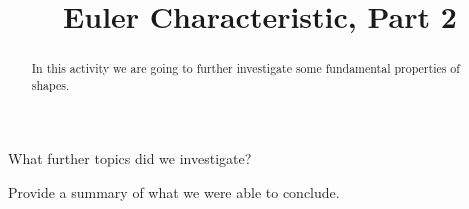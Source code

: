\documentclass[handout,newpage]{ximera}
\title{Euler Characteristic, Part 2}
\begin{document}
\begin{abstract}
In this activity we are going to further investigate some fundamental
properties of shapes.
\end{abstract}
\maketitle

\begin{question}
What further topics did we investigate? 
\begin{freeResponse}
\end{freeResponse}
\end{question}


\begin{question}
Provide a summary of what we were able to conclude.
\begin{freeResponse}
\end{freeResponse}
\end{question}
\end{document}

